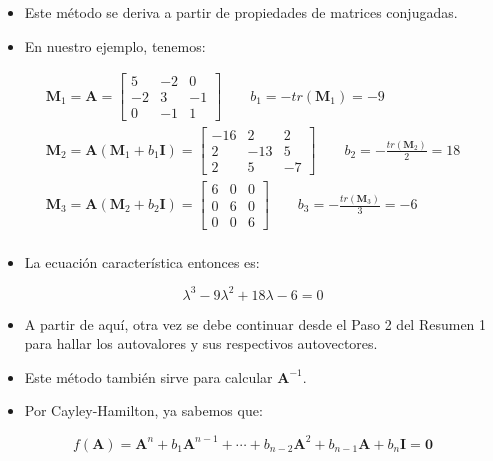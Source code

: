 \documentclass[openany]{book}
\providecommand{\tightlist}{%
  \setlength{\itemsep}{0pt}\setlength{\parskip}{0pt}}
\begin{document}
\begin{itemize}
\item
  Este método se deriva a partir de propiedades de matrices conjugadas.
\item
  En nuestro ejemplo, tenemos:
\end{itemize}

\begin{gather*}
\textbf{M}_1 = \textbf{A} = 
\begin{bmatrix} 
    5 & -2 & 0 \\ 
    -2 & 3 & -1 \\
    0 & -1 & 1  
\end{bmatrix} 
\qquad b_1 = - tr(\textbf{M}_1) = -9 \\
\textbf{M}_2 = \textbf{A} (\textbf{M}_{1} + b_{1} \textbf{I}) = 
\begin{bmatrix} 
    -16 & 2 & 2 \\ 
    2 & -13 & 5 \\
    2 & 5 & -7  
\end{bmatrix} 
\qquad b_2 = - \frac{tr(\textbf{M}_2)}{2} = 18\\
\textbf{M}_3 = \textbf{A} (\textbf{M}_{2} + b_{2} \textbf{I}) = 
\begin{bmatrix} 
    6 & 0 & 0 \\ 
    0 & 6 & 0 \\
    0 & 0 & 6  
\end{bmatrix} 
\qquad b_3 = - \frac{tr(\textbf{M}_3)}{3} = -6\\
\end{gather*}

\begin{itemize}
\tightlist
\item
  La ecuación característica entonces es:
\end{itemize}

\[
\lambda^3 - 9 \lambda^2 + 18 \lambda - 6 = 0
\]

\begin{itemize}
\item
  A partir de aquí, otra vez se debe continuar desde el Paso 2 del Resumen 1 para hallar los autovalores y sus respectivos autovectores.
\item
  Este método también sirve para calcular \(\textbf{A}^{-1}\).
\item
  Por Cayley-Hamilton, ya sabemos que:
\end{itemize}

\[
f(\textbf{A}) = \textbf{A}^n + b_1 \textbf{A}^{n-1}  + \cdots + b_{n-2} \textbf{A}^2  + b_{n-1} \textbf{A} + b_n \textbf{I} = \textbf{0}
\]
\end{document}
